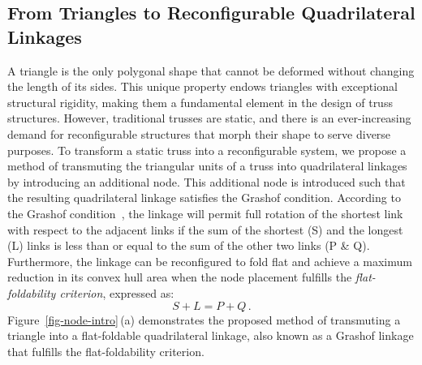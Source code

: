 \subsection{From Triangles to Reconfigurable Quadrilateral Linkages}\label{02-subsec-idealogy}
A triangle is the only polygonal shape that cannot be deformed without changing the length of its sides. This unique property endows triangles with exceptional structural rigidity, making them a fundamental element in the design of truss structures. However, traditional trusses are static, and there is an ever-increasing demand for reconfigurable structures that morph their shape to serve diverse purposes. To transform a static truss into a reconfigurable system, we propose a method of transmuting the triangular units of a truss into quadrilateral linkages~\citep{barker1985complete} by introducing an additional node. This additional node is introduced such that the resulting quadrilateral linkage satisfies the Grashof condition. According to the Grashof condition~\citep{grashof1883voss}, the linkage will permit full rotation of the shortest link with respect to the adjacent links if the sum of the shortest (S) and the longest (L) links is less than or equal to the sum of the other two links (P \& Q). Furthermore, the linkage can be reconfigured to fold flat and achieve a maximum reduction in its convex hull area when the node placement fulfills the \textit{flat-foldability criterion}, expressed as:
\begin{equation}\label{eq-ff-criterion}
 S + L = P + Q\,.
\end{equation}
Figure~\ref{fig-node-intro}\,(a) demonstrates the proposed method of transmuting a triangle into a flat-foldable quadrilateral linkage, also known as a Grashof linkage that fulfills the flat-foldability criterion.

